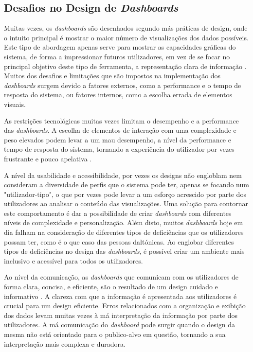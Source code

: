 \subsection{Desafios no Design de \textit{Dashboards}}
\label{sec:desafios_design}

Muitas vezes, os \textit{dashboards} são desenhados segundo más práticas de design, onde o intuito principal é mostrar o maior número de visualizações dos dados possíveis. Este tipo de abordagem apenas serve para mostrar as capacidades gráficas do sistema, de forma a impressionar futuros utilizadores, em vez de se focar no principal objetivo deste tipo de ferramenta, a representação clara de informação \cite{janes2013effective}. Muitos dos desafios e limitações que são impostos na implementação dos \textit{dashboards} surgem devido a fatores externos, como a performance e o tempo de resposta do sistema, ou fatores internos, como a escolha errada de elementos visuais. 

As restrições tecnológicas muitas vezes limitam o desempenho e a performance das \textit{dashboards}. A escolha de elementos de interação com uma complexidade e peso elevados podem levar a um mau desempenho, a nível da performance e tempo de resposta do sistema, tornando a experiência do utilizador por vezes frustrante e pouco apelativa \cite{eckerson2010performance}. 

A nível da usabilidade e acessibilidade, por vezes os designs não engloblam nem consideram a diversidade de perfis que o sistema pode ter, apenas se focando num "utilizador-tipo", o que por vezes pode levar a um esforço acrescido por parte dos utilizadores ao analisar o conteúdo das visualizações. Uma solução para contornar este comportamento é dar a possibilidade de criar \textit{dashboards} com diferentes níveis de complexidade e personalização. Além disto, muitos \textit{dashboards} hoje em dia falham na consideração de diferentes tipos de deficiências que os utilizadores possam ter, como é o que caso das pessoas daltónicas. Ao englobar diferentes tipos de deficiências no design das \textit{dashboards}, é possível criar um ambiente mais inclusivo e acessível para todos os utilizadores.

Ao nível da comunicação, as \textit{dashboards} que comunicam com os utilizadores de forma clara, concisa, e eficiente, são o resultado de um design cuidado e informativo \cite{few2005common}. A clareza com que a informação é apresentada aos utilizadores é crucial para um design eficiente. Erros relacionados com a organização e exibição dos dados levam muitas vezes à má interpretação da informação por parte dos utilizadores. A má comunicação do \textit{dashboard} pode surgir quando o design da mesma não está orientado para o publico-alvo em questão, tornando a sua interpretação mais complexa e duradora.

